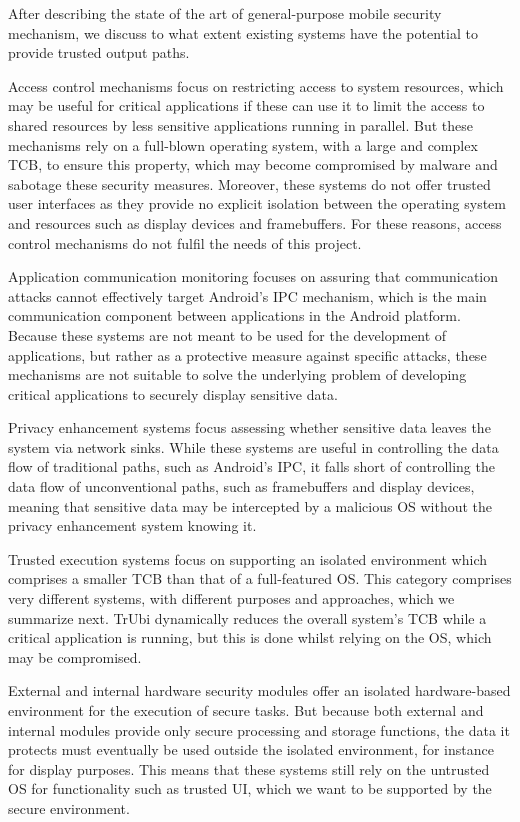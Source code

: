 After describing the state of the art of general-purpose mobile security mechanism, we discuss to what extent existing systems have the potential to provide trusted output paths.

Access control mechanisms focus on restricting access to system resources, which may be useful for critical applications if these can use it to limit the access to shared resources by less sensitive applications running in parallel. But these mechanisms rely on a full-blown operating system, with a large and complex TCB, to ensure this property, which may become compromised by malware and sabotage these security measures. Moreover, these systems do not offer trusted user interfaces as they provide no explicit isolation between the operating system and resources such as display devices and framebuffers. For these reasons, access control mechanisms do not fulfil the needs of this project.

Application communication monitoring focuses on assuring that communication attacks cannot effectively target Android's IPC mechanism, which is the main communication component between applications in the Android platform. Because these systems are not meant to be used for the development of applications, but rather as a protective measure against specific attacks, these mechanisms are not suitable to solve the underlying problem of developing critical applications to securely display sensitive data.

Privacy enhancement systems focus assessing whether sensitive data leaves the system via network sinks. While these systems are useful in controlling the data flow of traditional paths, such as Android's IPC, it falls short of controlling the data flow of unconventional paths, such as framebuffers and display devices, meaning that sensitive data may be intercepted by a malicious OS without the privacy enhancement system knowing it.

Trusted execution systems focus on supporting an isolated environment which comprises a smaller TCB than that of a full-featured OS. This category comprises very different systems, with different purposes and approaches, which we summarize next. TrUbi dynamically reduces the overall system's TCB while a critical application is running, but this is done whilst relying on the OS, which may be compromised.

External and internal hardware security modules offer an isolated hardware-based environment for the execution of secure tasks. But because both external and internal modules provide only secure processing and storage functions, the data it protects must eventually be used outside the isolated environment, for instance for display purposes. This means that these systems still rely on the untrusted OS for functionality such as trusted UI, which we want to be supported by the secure environment.

